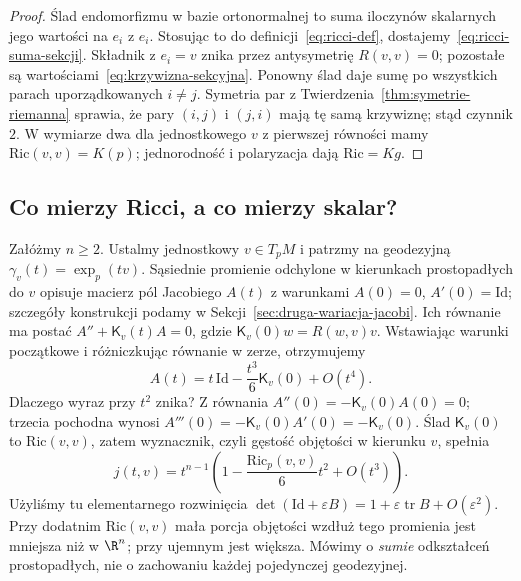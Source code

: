 \begin{proof}
Ślad endomorfizmu w bazie ortonormalnej to suma
iloczynów skalarnych jego wartości na $e_i$ z $e_i$.
Stosując to do definicji~\eqref{eq:ricci-def},
dostajemy~\eqref{eq:ricci-suma-sekcji}. Składnik
z $e_i=v$ znika przez antysymetrię $R(v,v)=0$;
pozostałe są wartościami~\eqref{eq:krzywizna-sekcyjna}.
Ponowny ślad daje sumę po wszystkich parach
uporządkowanych $i\ne j$. Symetria par z
Twierdzenia~\ref{thm:symetrie-riemanna} sprawia,
że pary $(i,j)$ i $(j,i)$ mają tę samą krzywiznę;
stąd czynnik $2$. W wymiarze dwa dla jednostkowego
$v$ z pierwszej równości mamy
$\mathrm{Ric}(v,v)=K(p)$; jednorodność i polaryzacja
dają $\mathrm{Ric}=Kg$.
\end{proof}

\subsection*{Co mierzy Ricci, a co mierzy skalar?}
Załóżmy $n\geq2$. Ustalmy jednostkowy $v\in T_pM$ i patrzmy na geodezyjną
$\gamma_v(t)=\exp_p(tv)$. Sąsiednie promienie odchylone
w kierunkach prostopadłych do $v$ opisuje macierz pól
Jacobiego $A(t)$ z warunkami
$A(0)=0$, $A'(0)=\mathrm{Id}$; szczegóły konstrukcji
podamy w Sekcji~\ref{sec:druga-wariacja-jacobi}.
Ich równanie ma postać
$A''+\mathsf K_v(t)A=0$, gdzie
$\mathsf K_v(0)w=R(w,v)v$. Wstawiając warunki
początkowe i różniczkując równanie w zerze, otrzymujemy
\[
 A(t)=t\,\mathrm{Id}-\frac{t^3}{6}\mathsf K_v(0)+O(t^4).
\]
Dlaczego wyraz przy $t^2$ znika? Z równania
$A''(0)=-\mathsf K_v(0)A(0)=0$; trzecia pochodna
wynosi $A'''(0)=-\mathsf K_v(0)A'(0)=-\mathsf K_v(0)$.
Ślad $\mathsf K_v(0)$ to $\mathrm{Ric}(v,v)$, zatem
wyznacznik, czyli gęstość objętości w kierunku $v$,
spełnia
\begin{equation}\label{eq:ricci-gestosc-malej-kuli}
 j(t,v)=t^{n-1}\left(1-\frac{\mathrm{Ric}_p(v,v)}6t^2
                              +O(t^3)\right).
\end{equation}
Użyliśmy tu elementarnego rozwinięcia
$\det(\mathrm{Id}+\varepsilon B)
=1+\varepsilon\operatorname{tr}B+O(\varepsilon^2)$.
Przy dodatnim $\mathrm{Ric}(v,v)$ mała porcja objętości
wzdłuż tego promienia jest mniejsza niż w $\R^n$;
przy ujemnym jest większa. Mówimy o \emph{sumie}
odkształceń prostopadłych, nie o zachowaniu każdej
pojedynczej geodezyjnej.

